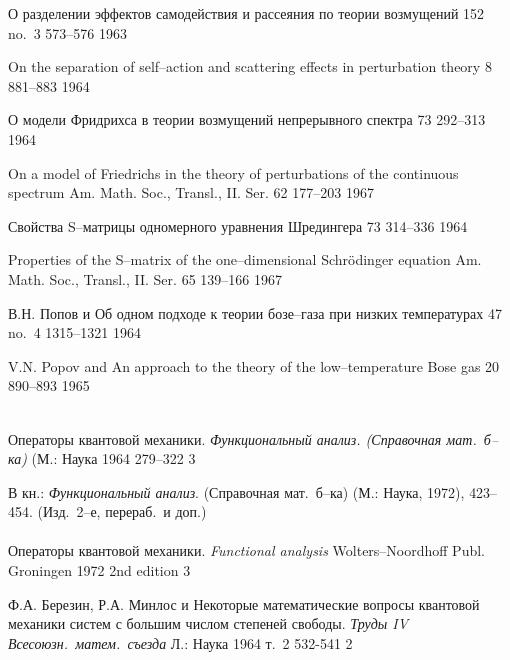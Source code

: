 {\LD}
{О разделении эффектов самодействия и рассеяния по теории возмущений}
{\DAN} {152} {no.~3} {573--576} {1963}

{\LF}
{On the separation of self--action and scattering effects in
  perturbation theory}
{\SPD} {8} {881--883} {1964}

{\LD}
{О модели Фридрихса в теории возмущений непрерывного спектра}
{\Trudy} {73} {} {292--313} {1964}

{\LF}
{On a model of Friedrichs in the theory of perturbations of the
  continuous spectrum}
{Am. Math. Soc., Transl., II. Ser.} {62} {177--203} {1967}

{\LD}
{Свойства S--матрицы одномерного уравнения Шредингера}
{\Trudy} {73} {} {314--336} {1964}

{\LF}
{Properties of the S--matrix of the one--dimensional {S}chr\"odinger
  equation}
{Am. Math. Soc., Transl., II. Ser.} {65} {139--166} {1967}

{В.Н. Попов и \LD}
{Об одном подходе к теории бозе--газа при низких температурах}
{\ZETF} {47} {no.~4} {1315--1321} {1964}

{V.N. Popov and \LF}
{An approach to the theory of the low--temperature {B}ose gas}
{\JETP} {20}  {890--893} {1965}

{\LD}\\
{Операторы квантовой механики.} 
{\em Функциональный анализ. (Справочная мат.\ б--ка)}
{(М.: Наука} {} {1964} {} {279--322} {3}


В кн.: {\em Функциональный анализ}. (Справочная мат.\ б--ка)
(М.: Наука, 1972), {423--454}.
(Изд.\ 2--е, перераб.\ и доп.) \\ [1mm]

{\LD}\\
{Операторы квантовой механики.} 
{\em Functional analysis} {Wolters--Noordhoff Publ.} {Groningen} {1972}
{2nd edition} {} {3}

{Ф.А. Березин, Р.А. Минлос и \LD} 
{Некоторые математические вопросы квантовой механики
систем с большим числом степеней свободы.} 
{\em Труды IV Всесоюзн.\ матем.\ съезда}
{Л.: Наука} {} {1964} {т.~2} {532-541} {2}

